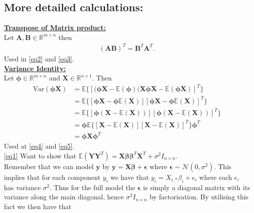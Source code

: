 \documentclass[12pt,
               a4paper,
               article,
               oneside,
               norsk,oldfontcommands]{memoir}
\newcommand{\spaze}{\vspace{4mm}\\}
\begin{document}
\subsection{More detailed calculations:}
\underline{\textbf{Transpose of Matrix product:}} \spaze 
Let $\mathbf{A}, \mathbf{B} \in \mathbb{R}^{m \times n}$ then 
\begin{align*}
\left( \mathbf{A} \mathbf{B} \right)^T = \mathbf{B}^T \mathbf{A}^T.
\end{align*}
Used in \eqref{eq2} and \eqref{eq3}. \spaze 
\underline{\textbf{Variance Identity:}} \spaze 
Let $\boldsymbol{\phi} \in \mathbb{R}^{m \times n}$ and $\mathbf{X} \in \mathbb{R}^{n \times 1}$. Then 
\begin{align*}
\text{Var}(\boldsymbol{\phi} \mathbf{X}) &= \mathbb{E} \{ [ (\boldsymbol{\phi} \mathbf{X} - \mathbb{E}( \boldsymbol{\phi}) (\mathbf{X} \boldsymbol{\phi} \mathbf{X} - \mathbb{E}(\boldsymbol{\phi} \mathbf{X})]^{T} \} \\[5pt] 
&=\mathbb{E} \{ [\boldsymbol{\phi} \mathbf{X} - \boldsymbol{\phi} \mathbb{E}( \mathbf{X})] [\boldsymbol{\phi} \mathbf{X} - \boldsymbol{\phi}\mathbb{E}(\mathbf{X})]^{T} \} \\[5pt] 
&= \mathbb{E} \{ [\boldsymbol{\phi}( \mathbf{X} -\mathbb{E}( \mathbf{X}))] [\boldsymbol{\phi} (\mathbf{X} - \mathbb{E}(\mathbf{X}))]^{T} \}  \\[5pt]
&= \boldsymbol{\phi} \mathbb{E} \{ [\mathbf{X} -\mathbb{E}( \mathbf{X})] [\mathbf{X} - \mathbb{E}(\mathbf{X})]^{T} \} \boldsymbol{\phi}^T \\[5pt]
&= \boldsymbol{\phi} \mathbf{X} \boldsymbol{\phi}^T
\end{align*}
Used at \eqref{eq4} and \eqref{eq5}.
\spaze 
\eqref{eq1} Want to show that $\mathbb{E}( \mathbf{Y} \mathbf{Y}^T) = \mathbf{X} \boldsymbol{\beta} \boldsymbol{\beta}^T \mathbf{X}^T + \sigma^2 I_{n \times n}$. \spaze 
Remember that we can model $\mathbf{y}$ by  $\mathbf{y} =\mathbf{X} \boldsymbol{\beta} + \boldsymbol{\epsilon}$ where $\boldsymbol{\epsilon} \sim \mathcal{N}(0, \sigma^2)$. This implies that for each component $y_{i}$ we have that $y_{i} =X_{i, *} \beta_{i} + \epsilon_{i}$ where each $\epsilon_{i}$ has variance $\sigma^2$. Thus for the full model the $\boldsymbol{\epsilon}$ is simply a diagonal matrix with its variance along the main diagonal, hence $\sigma^2 I_{n \times n}$ by factorisation. By utilising this fact we then have that
\end{document}

